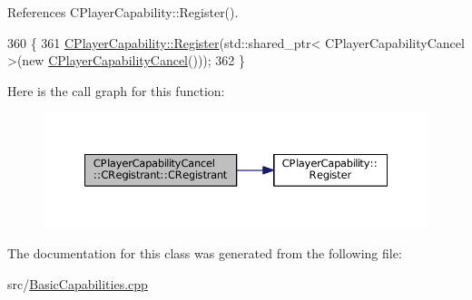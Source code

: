 References C\+Player\+Capability\+::\+Register().


\begin{DoxyCode}
360                                                \{
361     \hyperlink{classCPlayerCapability_a7e298018dcde2684451add3cfff065f7}{CPlayerCapability::Register}(std::shared\_ptr< CPlayerCapabilityCancel >(\textcolor{keyword}{new} 
      \hyperlink{classCPlayerCapabilityCancel_a7e3ac034b99b436032fdd2059d2fb727}{CPlayerCapabilityCancel}()));   
362 \}
\end{DoxyCode}
Here is the call graph for this function\+:\nopagebreak
\begin{figure}[H]
\begin{center}
\leavevmode
\includegraphics[width=350pt]{classCPlayerCapabilityCancel_1_1CRegistrant_a78f5bc9125ca55fc86efdabf1faaa363_cgraph}
\end{center}
\end{figure}


The documentation for this class was generated from the following file\+:\begin{DoxyCompactItemize}
\item 
src/\hyperlink{BasicCapabilities_8cpp}{Basic\+Capabilities.\+cpp}\end{DoxyCompactItemize}
